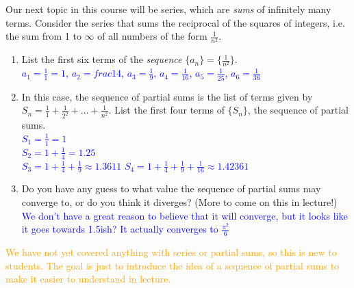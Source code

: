 \documentclass{ximera}
\begin{document}
\begin{exercise}
    Our next topic in this course will be series, which are \textit{sums} of infinitely many terms.  Consider the series that sums the reciprocal of the squares of integers, i.e. the sum from 1 to $\infty$ of all numbers of the form $\frac{1}{n^2}$.
    \begin{enumerate}
        \item List the first six terms of the \textit{sequence} $\{a_n\}=\{\frac{1}{n^2}\}$.\\
        \textcolor{blue}{$a_1=\frac{1}{1}=1$, $a_2=frac14$, $a_3=\frac19$, $a_4=\frac1{16}$, $a_5=\frac1{25}$, $a_6=\frac{1}{36}$}
        \item In this case, the sequence of partial sums is the list of terms given by $S_n=\frac{1}{1}+\frac{1}{2^2}+\dots +\frac{1}{n^2}$. List the first four terms of $\{S_n\}$, the sequence of partial sums.\\
        \textcolor{blue}{$S_1=\frac{1}{1}=1$\\
        $S_2=1+\frac14=1.25$\\
        $S_3=1+\frac14+\frac19\approx 1.3611$
        $S_4=1+\frac14+\frac19+\frac1{16}\approx 1.42361$}
        \item Do you have any guess to what value the sequence of partial sums may converge to, or do you think it diverges?  (More to come on this in lecture!)\\
        \textcolor{blue}{We don't have a great reason to believe that it will converge, but it looks like it goes towards 1.5ish?  It actually converges to $\frac{\pi^2}{6}$}
    \end{enumerate}
    \textcolor{orange}{We have not yet covered anything with series or partial sums, so this is new to students.  The goal is just to introduce the idea of a sequence of partial sums to make it easier to understand in lecture.}
\end{exercise}
\end{document}
